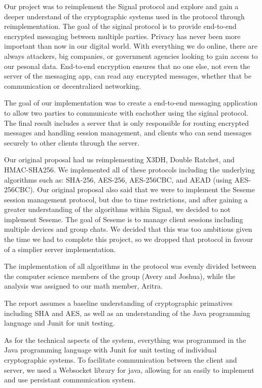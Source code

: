 Our project was to reimplement the Signal protocol and explore and gain a deeper understand of 
the cryptographic systems used in the protocol through reimplementation. The goal of the siginal protocol 
is to provide end-to-end encrypted messaging between multiple parties. Privacy has 
never been more important than now in our digital world. With everything we do online, 
there are always attackers, big companies, or government agencies looking to gain access to our pesonal
data. End-to-end encryption ensures that no one else, not even the server of the messaging app, can read 
any encrypted messages, whether that be communication or decentralized networking.

The goal of our implementation was to create a end-to-end messaging application to allow two parties 
to communicate with eachother using the siginal protocol. The final result includes a server that is only
responsible for routing encrypted messages and handling session management, and clients who can send messages
securely to other clients through the server.

Our original proposal had us reimplementing X3DH, Double Ratchet, and HMAC-SHA256. We implemented all of these protocols
including the underlying algorithms such as: SHA-256, AES-256, AES-256CBC, and AEAD (using AES-256CBC). 
Our original proposal also said that we were to implement the Seseme session management protocol, but due to time restrictions,
and after gaining a greater understanding of the algorithms within Signal, we decided to not implement Seseme.
The goal of Seseme is to manage client sessions including multiple devices and group chats. We decided that this was too ambitious 
given the time we had to complete this project, so we dropped that protocol in favour of a simplier server implementation.

The implementation of all algorithms in the protocol was evenly divided between the computer science members of the group (Avery and Joshua),
while the analysis was assigned to our math member, Aritra.

The report assumes a baseline understanding of cryptographic primatives including SHA and AES, as well as an understanding 
of the Java programming language and Junit for unit testing.

As for the technical aspects of the system, everything was programmed in the Java programming language with Junit for unit testing of 
individual cryptographic systems. To facilitate communication between the client and server, we used a Websocket library for java,
allowing for an easily to implement and use persistant communication system.
